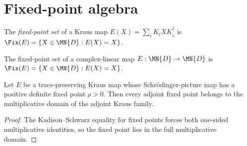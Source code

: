 \section{Fixed-point algebra}
\label{sec:fixed_point_algebra}

\begin{definition}\label{def:kraus_fixed_points}
    \leanok
    The \emph{fixed-point set} of a Kraus map
    $E(X)=\sum_iK_iXK_i^\dagger$ is
    $\Fix(E)=\{X\in\MN{D}:E(X)=X\}$.
\end{definition}

\begin{definition}\label{def:abstract_fixed_points}
    \leanok
    The fixed-point set of a complex-linear map
    $E:\MN{D}\to\MN{D}$ is $\Fix(E)=\{X\in\MN{D}:E(X)=X\}$.
\end{definition}

\begin{theorem}
    \label{thm:fixedPoints_in_multiplicativeDomain}
    \leanok
    Let $E$ be a trace-preserving Kraus map whose Schr{\"o}dinger-picture map has a
    positive definite fixed point $\rho>0$.
    Then every adjoint fixed point belongs to the multiplicative domain of the
    adjoint Kraus family.
\end{theorem}

\begin{proof}\leanok
    The Kadison--Schwarz equality for fixed points forces both one-sided
    multiplicative identities, so the fixed point lies in the full
    multiplicative domain.
\end{proof}

